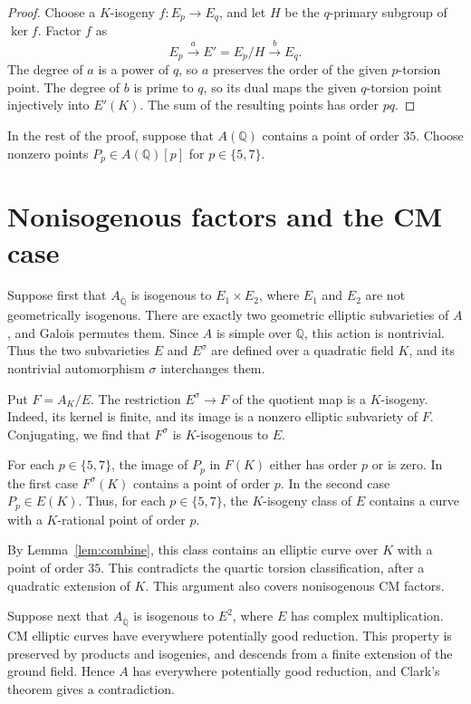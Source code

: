 \documentclass[11pt]{article}
\newcommand{\Q}{\mathbb Q}
\begin{document}
\begin{proof}
Choose a \(K\)-isogeny \(f:E_p\to E_q\), and let \(H\) be the
\(q\)-primary subgroup of \(\ker f\). Factor \(f\) as
\[
 E_p\xrightarrow{a}E'=E_p/H\xrightarrow{b}E_q.
\]
The degree of \(a\) is a power of \(q\), so \(a\) preserves the
order of the given \(p\)-torsion point. The degree of \(b\) is
prime to \(q\), so its dual maps the given \(q\)-torsion point
injectively into \(E'(K)\). The sum of the resulting points has
order \(pq\).
\end{proof}

In the rest of the proof, suppose that \(A(\Q)\) contains a point
of order \(35\). Choose nonzero points
\(P_p\in A(\Q)[p]\) for \(p\in\{5,7\}\).

\section{Nonisogenous factors and the CM case}

Suppose first that \(A_{\overline{\Q}}\) is isogenous to
\(E_1\times E_2\), where \(E_1\) and \(E_2\) are not
geometrically isogenous. There are exactly two geometric elliptic
subvarieties of \(A\), and Galois permutes them. Since \(A\) is
simple over \(\Q\), this action is nontrivial. Thus the two
subvarieties \(E\) and \(E^\sigma\) are defined over a quadratic
field \(K\), and its nontrivial automorphism \(\sigma\) interchanges
them.

Put \(F=A_K/E\). The restriction \(E^\sigma\to F\) of the quotient
map is a \(K\)-isogeny. Indeed, its kernel is finite, and its image
is a nonzero elliptic subvariety of \(F\). Conjugating, we find
that \(F^\sigma\) is \(K\)-isogenous to \(E\).

For each \(p\in\{5,7\}\), the image of \(P_p\) in \(F(K)\) either
has order \(p\) or is zero. In the first case \(F^\sigma(K)\)
contains a point of order \(p\). In the second case
\(P_p\in E(K)\). Thus, for each \(p\in\{5,7\}\), the \(K\)-isogeny
class of \(E\) contains a curve with a \(K\)-rational point of
order \(p\).

By Lemma~\ref{lem:combine}, this class contains an elliptic curve
over \(K\) with a point of order \(35\). This contradicts the
quartic torsion classification, after a quadratic extension of
\(K\). This argument also covers nonisogenous CM factors.

Suppose next that \(A_{\overline{\Q}}\) is isogenous to \(E^2\),
where \(E\) has complex multiplication. CM elliptic curves have
everywhere potentially good reduction. This property is preserved
by products and isogenies, and descends from a finite extension
of the ground field. Hence \(A\) has everywhere potentially good
reduction, and Clark's theorem gives a contradiction.
\end{document}
